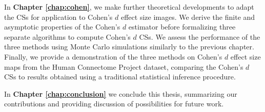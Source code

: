 In \textbf{Chapter \ref{chap:cohen}}, we make further theoretical developments to adapt the CSs for application to Cohen's $d$ effect size images. We derive the finite and asymptotic properties of the Cohen's $d$ estimator before formalizing three separate algorithms to compute Cohen's $d$ CSs. We assess the performance of the three methods using Monte Carlo simulations similarly to the previous chapter. Finally, we provide a demonstration of the three methods on Cohen's $d$ effect size maps from the Human Connectome Project dataset, comparing the Cohen's $d$ CSs to results obtained using a traditional statistical inference procedure.    

In \textbf{Chapter \ref{chap:conclusion}} we conclude this thesis, summarizing our contributions and providing discussion of possibilities for future work. 

